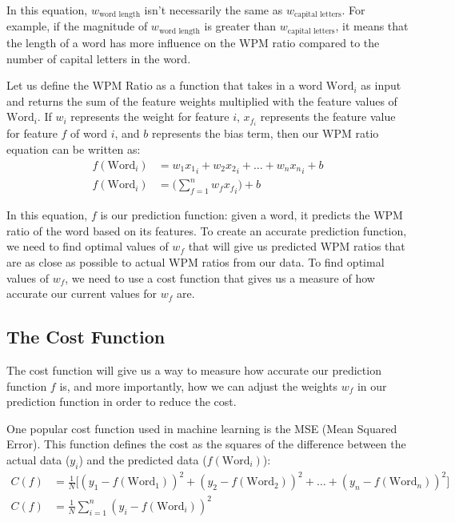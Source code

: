 \documentclass[12pt]{article}
\begin{document}
In this equation, $w_{\text{word length}}$ isn't necessarily the same as $w_{\text{capital letters}}$. For example, if the magnitude of $w_{\text{word length}}$ is greater than $w_{\text{capital letters}}$, it means that the length of a word has more influence on the WPM ratio compared to the number of capital letters in the word.

Let us define the WPM Ratio as a function that takes in a word $\text{Word}_i$ as input and returns the sum of the feature weights multiplied with the feature values of $\text{Word}_i$. If $w_i$ represents the weight for feature $i$, $x_{f_i}$ represents the feature value for feature $f$ of word $i$, and $b$ represents the bias term, then our WPM ratio equation can be written as:
\begin{align*}
	f(\text{Word}_i) & = w_1{x_1}_i + w_2{x_2}_i + \dots + w_n{x_n}_i + b
	\\
	f(\text{Word}_i) & = \Big(\sum_{f=1}^{n} w_f{x_f}_i\Big) + b
\end{align*}

In this equation, $f$ is our prediction function: given a word, it predicts the WPM ratio of the word based on its features. To create an accurate prediction function, we need to find optimal values of $w_f$ that will give us predicted WPM ratios that are as close as possible to actual WPM ratios from our data. To find optimal values of $w_f$, we need to use a cost function that gives us a measure of how accurate our current values for $w_f$ are.

\subsection*{The Cost Function}

The cost function will give us a way to measure how accurate our prediction function $f$ is, and more importantly, how we can adjust the weights $w_f$ in our prediction function in order to reduce the cost.

One popular cost function used in machine learning is the MSE (Mean Squared Error). This function defines the cost as the squares of the difference between the actual data ($y_i$) and the predicted data ($f(\text{Word}_i)$):
\begin{align*}
	C(f) & = \frac{1}{N}\big[(y_1 - f(\text{Word}_1))^2 + (y_2 - f(\text{Word}_2))^2 + \dots + (y_n - f(\text{Word}_n))^2]
	\\
	C(f) & = \frac{1}{N} \sum_{i=1}^{n} (y_i - f(\text{Word}_i))^2
\end{align*}
\end{document}
